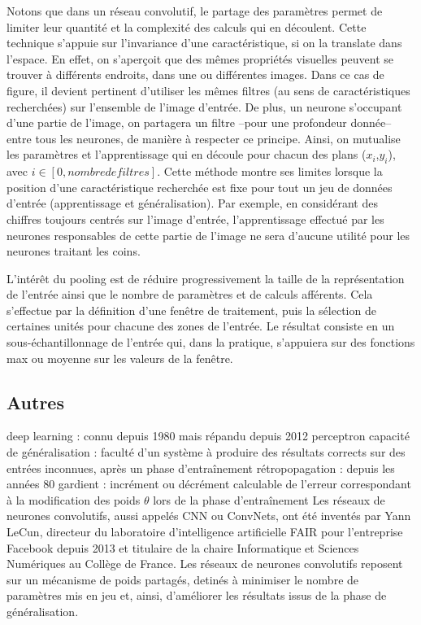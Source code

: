 \documentclass[a4paper,10pt]{report}
\begin{document}
Notons que dans un réseau convolutif, le partage des paramètres permet de limiter leur quantité et la complexité des calculs qui en découlent. 
Cette technique s’appuie sur l’invariance d’une caractéristique, si on la translate dans l’espace. 
En effet, on s’aperçoit que des mêmes propriétés visuelles peuvent se trouver à différents endroits, dans une ou différentes images. 
Dans ce cas de figure, il devient pertinent d’utiliser les mêmes filtres (au sens de caractéristiques recherchées) sur l’ensemble de l’image d’entrée. 
De plus, un neurone s’occupant d’une partie de l’image, on partagera un filtre –pour une profondeur donnée– entre tous les neurones, de manière à respecter ce principe. 
Ainsi, on mutualise les paramètres et l’apprentissage qui en découle pour chacun des plans ($x_{i}$,$y_{i}$), avec $i  \in [0, nombre de filtres]$. 
Cette méthode montre ses limites lorsque la position d’une caractéristique recherchée est fixe pour tout un jeu de données d’entrée (apprentissage et généralisation). 
Par exemple, en considérant des chiffres toujours centrés sur l’image d’entrée, l’apprentissage effectué par les neurones responsables de cette partie de l’image ne sera d’aucune utilité pour les neurones traitant les coins.  
\par
L’intérêt du pooling est de réduire progressivement la taille de la représentation de l’entrée ainsi que le nombre de paramètres et de calculs afférents. 
Cela s’effectue par la définition d’une fenêtre de traitement, puis la sélection de certaines unités pour chacune des zones de l’entrée. 
Le résultat consiste en un sous-échantillonnage de l’entrée qui, dans la pratique, s’appuiera sur des fonctions max ou moyenne sur les valeurs de la fenêtre. 

\subsection{Autres}
deep learning : connu depuis 1980 mais répandu depuis 2012
perceptron
capacité de généralisation : faculté d'un système à produire des résultats corrects sur des entrées inconnues, après un phase d'entraînement
rétropopagation : depuis les années 80
gardient : incrément ou décrément calculable de l'erreur correspondant à la modification des poids $\theta$ lors de la phase d'entraînement
Les réseaux de neurones convolutifs, aussi appelés CNN ou ConvNets, ont été inventés par Yann LeCun, directeur du laboratoire d'intelligence artificielle FAIR pour
l'entreprise Facebook depuis 2013 et titulaire de la chaire Informatique et Sciences Numériques au Collège de France. 
Les réseaux de neurones convolutifs reposent sur un mécanisme de poids partagés, detinés à minimiser le nombre de paramètres mis en jeu et, ainsi, d'améliorer les
résultats issus de la phase de généralisation. 
\end{document}
